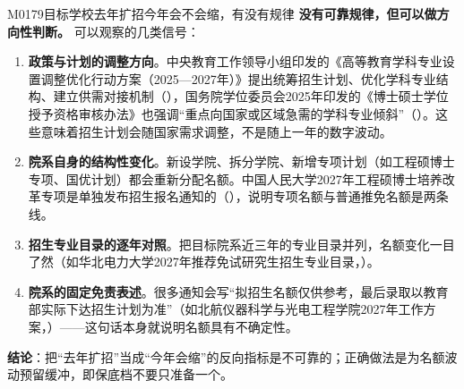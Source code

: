 \begin{qa}{M0179}{目标学校去年扩招今年会不会缩，有没有规律}
\textbf{没有可靠规律，但可以做方向性判断。}
可以观察的几类信号：
\begin{enumerate}
  \item \textbf{政策与计划的调整方向}。中央教育工作领导小组印发的《高等教育学科专业设置调整优化行动方案（2025—2027年）》提出统筹招生计划、优化学科专业结构、建立供需对接机制（），国务院学位委员会2025年印发的《博士硕士学位授予资格审核办法》也强调“重点向国家或区域急需的学科专业倾斜”（）。这些意味着招生计划会随国家需求调整，不是随上一年的数字波动。
  \item \textbf{院系自身的结构性变化}。新设学院、拆分学院、新增专项计划（如工程硕博士专项、国优计划）都会重新分配名额。中国人民大学2027年工程硕博士培养改革专项是单独发布招生报名通知的（），说明专项名额与普通推免名额是两条线。
  \item \textbf{招生专业目录的逐年对照}。把目标院系近三年的专业目录并列，名额变化一目了然（如华北电力大学2027年推荐免试研究生招生专业目录，）。
  \item \textbf{院系的固定免责表述}。很多通知会写“拟招生名额仅供参考，最后录取以教育部实际下达招生计划为准”（如北航仪器科学与光电工程学院2027年工作方案，）——这句话本身就说明名额具有不确定性。
\end{enumerate}
\textbf{结论}：把“去年扩招”当成“今年会缩”的反向指标是不可靠的；正确做法是为名额波动预留缓冲，即保底档不要只准备一个。
\end{qa}

